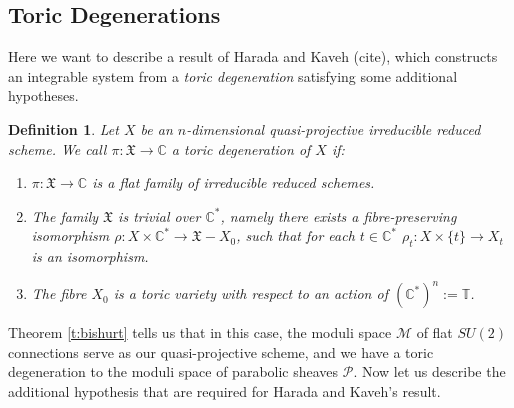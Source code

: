 \documentclass[]{article}
\newtheorem{definition}{Definition}
\newcommand{\C}{\mathbb{C}}
\newcommand{\MM}{\mathcal{M}}
\newcommand{\cP}{\mathcal{P}}
\newcommand{\XX}{\mathfrak{X}}
\begin{document}
	\subsection{Toric Degenerations}
	Here we want to describe a result of Harada and Kaveh (cite), which constructs an integrable system from a \textit{toric degeneration} satisfying some additional hypotheses. 
	\begin{definition}
		\label{d:toricdegen}
		Let $X$ be an $n$-dimensional quasi-projective irreducible reduced scheme. We call $\pi: \XX\to\C$ a \emph{toric degeneration} of $X$ if:
		\begin{enumerate}
			\item $\pi:\XX\to\C$ is a flat family of irreducible reduced schemes.
			\item The family $\XX$ is trivial over $\C^\ast$, namely there exists a fibre-preserving isomorphism $\rho:X\times\C^\ast \to \XX - X_0$, such that for each $t\in \C^\ast$ $\rho_t:X\times\{t\} \to X_t$ is an isomorphism.
			\item The fibre $X_0$ is a toric variety with respect to an action of $(\C^\ast)^n := \mathbb{T}$.
		\end{enumerate}
	\end{definition}
	Theorem \ref{t:bishurt} tells us that in this case, the moduli space $\MM$ of flat $SU(2)$ connections serve as our quasi-projective scheme, and we have a toric degeneration to the moduli space of parabolic sheaves $\cP$. Now let us describe the additional hypothesis that are required for Harada and Kaveh's result.
	
\end{document}
